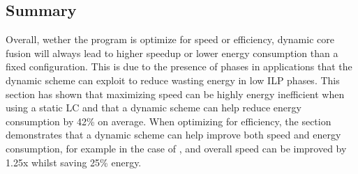 \subsection{Summary}

Overall, wether the program is optimize for speed or efficiency, dynamic core fusion will always lead to higher speedup or lower energy consumption than a fixed configuration.
This is due to the presence of phases in applications that the dynamic scheme can exploit to reduce wasting energy in low ILP phases.
This section has shown that maximizing speed can be highly energy inefficient when using a static LC and that a dynamic scheme can help reduce energy consumption by 42\% on average.
When optimizing for efficiency, the section demonstrates that a dynamic scheme can help improve both speed and energy consumption, for example in the case of , and overall speed can be improved by 1.25x whilst saving 25\% energy.

